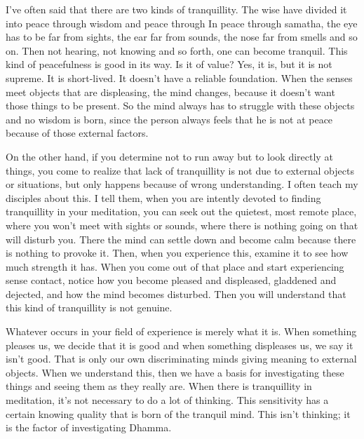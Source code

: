 I've often said that there are two kinds of tranquillity. The wise have divided it into peace through wisdom and peace through  In peace through samatha, the eye has to be far from sights, the ear far from sounds, the nose far from smells and so on. Then not hearing, not knowing and so forth, one can become tranquil. This kind of peacefulness is good in its way. Is it of value? Yes, it is, but it is not supreme. It is short-lived. It doesn't have a reliable foundation. When the senses meet objects that are displeasing, the mind changes, because it doesn't want those things to be present. So the mind always has to struggle with these objects and no wisdom is born, since the person always feels that he is not at peace because of those external factors. 

On the other hand, if you determine not to run away but to look directly at things, you come to realize that lack of tranquillity is not due to external objects or situations, but only happens because of wrong understanding. I often teach my disciples about this. I tell them, when you are intently devoted to finding tranquillity in your meditation, you can seek out the quietest, most remote place, where you won't meet with sights or sounds, where there is nothing going on that will disturb you. There the mind can settle down and become calm because there is nothing to provoke it. Then, when you experience this, examine it to see how much strength it has. When you come out of that place and start experiencing sense contact, notice how you become pleased and displeased, gladdened and dejected, and how the mind becomes disturbed. Then you will understand that this kind of tranquillity is not genuine. 

Whatever occurs in your field of experience is merely what it is. When something pleases us, we decide that it is good and when something displeases us, we say it isn't good. That is only our own discriminating minds giving meaning to external objects. When we understand this, then we have a basis for investigating these things and seeing them as they really are. When there is tranquillity in meditation, it's not necessary to do a lot of thinking. This sensitivity has a certain knowing quality that is born of the tranquil mind. This isn't thinking; it is  the factor of investigating Dhamma. 

